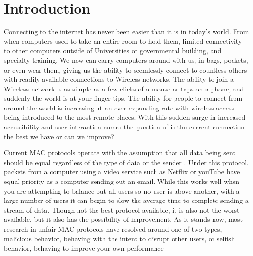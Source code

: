 \documentclass{sigcomm-alternate}
\begin{document}

\section{Introduction}


Connecting to the internet has never been easier than it is in today's world. From when computers used to take an entire room to hold them, limited connectivity to other computers outside of Universities or governmental building, and specialty training. We now can carry computers around with us, in bags, pockets, or even wear them, giving us the ability to seemlessly connect to countless others with readily available connections to Wireless networks. The ability to join a Wireless network is as simple as a few clicks of a mouse or taps on a phone, and suddenly the world is at your finger tips. The ability for people to connect from around the world is increasing at an ever expanding rate with wireless access being introduced to the most remote places. With this sudden surge in increased accessibility and user interaction comes the question of is the current connection the best we have or can we improve? 

Current MAC protocols operate with the assumption that all data being sent should be equal regardless of the type of data or the sender \cite{5340799, FairScheduling}. Under this protocol, packets from a computer using a video service such as Netflix or youTube have equal priority as a computer sending out an email. While this works well when you are attempting to balance out all users so no user is above another, with a large number of users it can begin to slow the average time to complete sending a stream of data. Though not the best protocol available, it is also not the worst available, but it also has the possibility of improvement. As it stands now, most research in unfair MAC protocols have resolved around one of two types, malicious behavior, behaving with the intent to disrupt other users,\cite{DDoS} or selfish behavior, behaving to improve your own performance\cite{Kyasanur}
\end{document}
